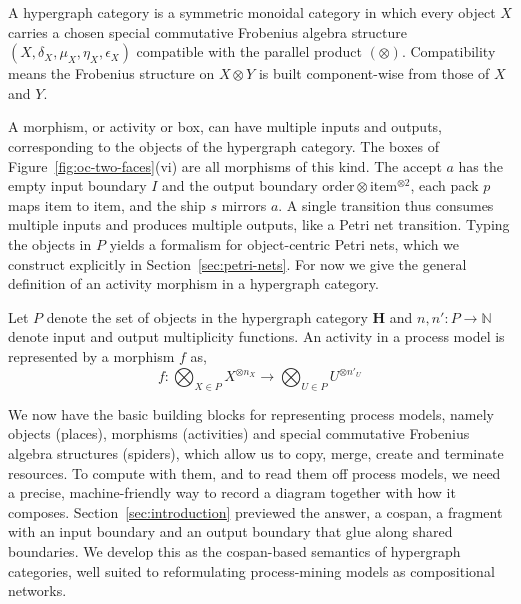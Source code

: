 \begin{definition}\label{def:hypergraph-category}
A hypergraph category is a symmetric monoidal category in which every
object $X$ carries a chosen special commutative Frobenius algebra structure
$(X,\delta_X,\mu_X,\eta_X,\epsilon_X)$ compatible with the parallel product $(\otimes)$.
Compatibility means the Frobenius structure on $X\otimes Y$ is built component-wise from those of $X$ and $Y$.
\end{definition}

A morphism, or activity or box, can have multiple inputs and outputs, corresponding to the objects of the hypergraph category. The boxes of
Figure~\ref{fig:oc-two-faces}(vi) are all morphisms of this kind. The accept
$a$ has the empty input boundary $I$ and the output boundary
$\mathrm{order}\otimes\mathrm{item}^{\otimes 2}$, each pack $p$ maps
$\mathrm{item}$ to $\mathrm{item}$, and the ship $s$ mirrors $a$. A single
transition thus consumes multiple inputs and produces multiple outputs, like a
Petri net transition. Typing the objects in $P$ yields a formalism for
object-centric Petri nets, which we construct explicitly in
Section~\ref{sec:petri-nets}. For now we give the general definition of an
activity morphism in a hypergraph category.
\begin{definition}
Let $P$ denote the set of objects in the hypergraph category $\mathbf{H}$ and $n,n':P\to\mathbb{N}$ denote input and output multiplicity functions. An activity in a process model is represented by a morphism $f$ as,
\[ f : \bigotimes_{X\in{}P}X^{\otimes{}n_X} \rightarrow \bigotimes_{U\in{}P}U^{\otimes{}n'_U} \]
\end{definition}
We now have the basic building blocks for representing process models, namely objects (places), morphisms (activities) and special commutative Frobenius algebra structures (spiders), which allow us to copy, merge, create and terminate resources. To compute with them, and to read them off process models, we need a precise, machine-friendly way to record a diagram together with how it composes. Section~\ref{sec:introduction} previewed the answer, a cospan, a fragment with an input boundary and an output boundary that glue along shared boundaries. We develop this as the cospan-based semantics of hypergraph categories, well suited to reformulating process-mining models as compositional networks.

